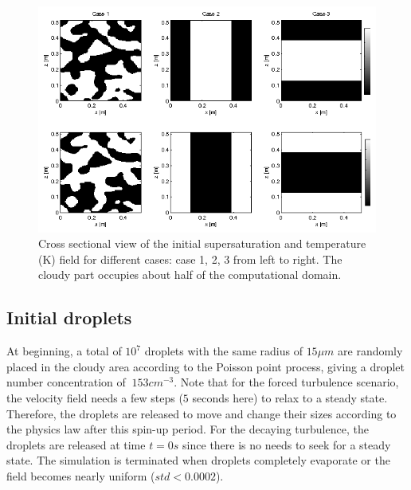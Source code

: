 \documentclass[draft,jgrga]{AGUTeX}
\begin{document}
\begin{article}
\begin{figure}\centering
\includegraphics[width=0.9\linewidth]{Figures/init_vapor_supersat}
\caption{Cross sectional view of the initial supersaturation and temperature (K) field for different cases: case 1, 2, 3 from left to right. The cloudy part occupies about half of the computational domain.\label{fig:slice_case123}}
\end{figure}

\subsection{Initial droplets}

At beginning, a total of $10^{7}$ droplets with the same radius of $15\mu m$  are randomly placed in the cloudy area according to the Poisson point process, giving a droplet number concentration of $ ~ 153{cm}^{-3}$. Note that for the forced turbulence scenario, the velocity field needs a few steps ($5$ seconds here) to relax to a steady state. Therefore, the droplets are released to move and change their sizes according to the physics law after this spin-up period. For the decaying turbulence, the droplets are released at time $t = 0s$ since there is no needs to seek for a steady state. The simulation is terminated when droplets completely evaporate or the field becomes nearly uniform ($std < 0.0002$). 


\end{article}
\end{document}
